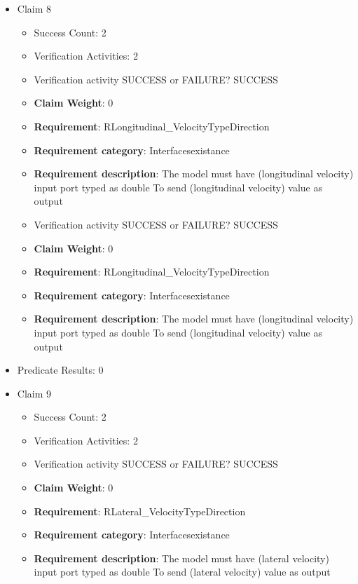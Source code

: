 \documentclass{article}
\begin{document}
\begin{itemize}
  				  \item Claim 8
				\begin{itemize}
			    	\item Success Count: 2 
			    	\item Verification Activities: 2
					\item Verification activity SUCCESS or FAILURE? SUCCESS
					\item \textbf{Claim Weight}: 0
						\item \textbf{Requirement}: RLongitudinal_VelocityTypeDirection 
						\item \textbf{Requirement category}: Interfacesexistance 
						\item \textbf{Requirement description}: The model must have (longitudinal velocity) input port typed as double To send (longitudinal velocity) value as output
					
					\item Verification activity SUCCESS or FAILURE? SUCCESS
					\item \textbf{Claim Weight}: 0
						\item \textbf{Requirement}: RLongitudinal_VelocityTypeDirection 
						\item \textbf{Requirement category}: Interfacesexistance 
						\item \textbf{Requirement description}: The model must have (longitudinal velocity) input port typed as double To send (longitudinal velocity) value as output
					
				\end{itemize}
				
									    
				\item Predicate Results: 0

  				  \item Claim 9
				\begin{itemize}
			    	\item Success Count: 2 
			    	\item Verification Activities: 2
					\item Verification activity SUCCESS or FAILURE? SUCCESS
					\item \textbf{Claim Weight}: 0
						\item \textbf{Requirement}: RLateral_VelocityTypeDirection 
						\item \textbf{Requirement category}: Interfacesexistance 
						\item \textbf{Requirement description}: The model must have (lateral velocity) input port typed as double To send (lateral velocity) value as output
					

\end{itemize}
\end{itemize}
\end{document}
